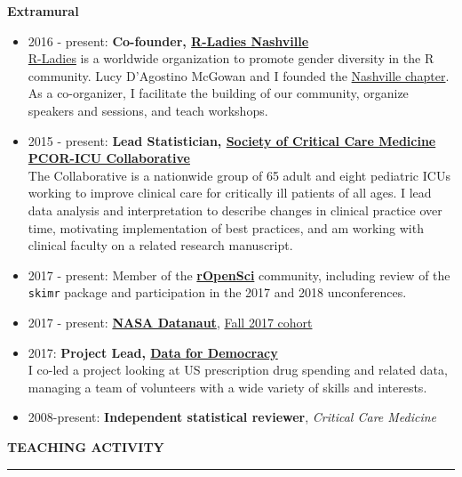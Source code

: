 \documentclass[5pt]{article}
\begin{document}
\noindent \textbf{Extramural}
\begin{itemize}
\item 2016 - present: \textbf{Co-founder, \href{https://www.meetup.com/rladies-nashville}{R-Ladies Nashville}}\\
\indent \href{http://www.rladies.org}{R-Ladies} is a worldwide organization to promote gender diversity in the R community. Lucy D'Agostino McGowan and I founded the \href{https://www.meetup.com/rladies-nashville}{Nashville chapter}.  As a co-organizer, I facilitate the building of our community, organize speakers and sessions, and teach workshops.
\item 2015 - present: \textbf{Lead Statistician, \href{www.iculiberation.org}{Society of Critical Care Medicine PCOR-ICU Collaborative}}\\
\indent The Collaborative is a nationwide group of 65 adult and eight pediatric ICUs working to improve clinical care for critically ill patients of all ages. I lead data analysis and interpretation to describe changes in clinical practice over time, motivating implementation of best practices, and am working with clinical faculty on a related research manuscript.
\item 2017 - present: Member of the  \textbf{\href{https://ropensci.org}{rOpenSci}} community, including review of the \texttt{skimr} package and participation in the 2017 and 2018 unconferences.
\item 2017 - present: \textbf{\href{https://open.nasa.gov/explore/datanauts/}{NASA Datanaut}}, \href{https://open.nasa.gov/explore/datanauts/2017/fall/}{Fall 2017 cohort}
\item 2017: \textbf{Project Lead, \href{http://datafordemocracy.org}{Data for Democracy}}\\ I co-led a project looking at US prescription drug spending and related data, managing a team of volunteers with a wide variety of skills and interests.
\item 2008-present: \textbf{Independent statistical reviewer}, \emph{Critical Care Medicine}
\end{itemize}

\clearpage
\noindent \linebreak \textbf{TEACHING ACTIVITY}\\
\rule[5pt]{\linewidth}{1.0pt}
\end{document}
